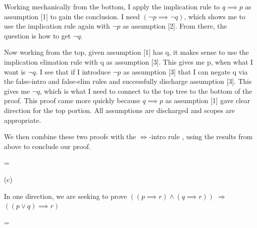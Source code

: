 \documentclass[a4paper,10pt,fleqn]{article}
\begin{document}
\noindent Working mechanically from the bottom, I apply the implication rule to $q \implies p$ as assumption [1] to gain the conclusion.  I need $(\lnot p \implies \lnot q)$, which shows me to use the implication rule again with $\lnot p$ as assumption [2].  From there, the question is how to get $\lnot q$.  

\bigskip

\noindent Now working from the top, given assumption [1] has q, it makes sense to use the implication elimation rule with q as assumption [3]. This gives me p, when what I want is $\lnot q$.  I see that if I introduce $\lnot p$ as assumption [3] that I can negate q via the false-intro and false-elim rules and successfully discharge assumption [3]. This gives me $\lnot q$, which is what I need to connect to the top tree to the bottom of the proof. This proof came more quickly because $q \implies p$ as assumption [1] gave clear direction for the top portion. All assumptions are discharged and scopes are appropriate.

\bigskip

\noindent We then combine these two proofs with the $\Leftrightarrow$-intro rule \citep[Slide 4]{simpson25h}, using the results from above to conclude our proof.

\bigskip

\savedleftskip=\leftskip
\noindent
{}
\bigskip

\newpage

\setlength{\leftskip}{0pt}
\medskip

\noindent\hspace*{\parindent}(c)

\setlength{\leftskip}{\dimexpr\parindent+2em\relax}
\noindent In one direction, we are seeking to prove $((p \implies r) \land (q \implies r))$ $\Rightarrow$ $((p \lor q) \implies r)$

\bigskip


\bigskip

\setlength{\leftskip}{\dimexpr\parindent+2em\relax}
\savedleftskip=\leftskip
\noindent
{}
\bigskip
\end{document}
